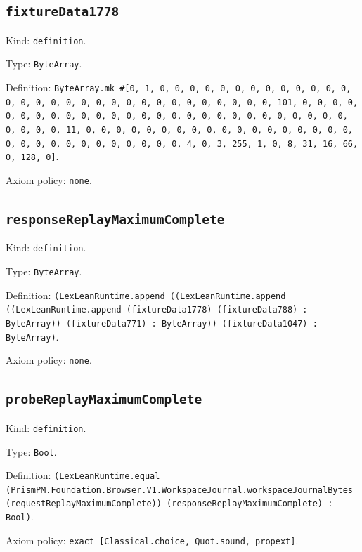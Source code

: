 \documentclass[11pt]{article}
\begin{document}
\subsection*{\texttt{fixtureData1778}}
\noindent Kind: \texttt{definition}.\par
\noindent Type: \texttt{ByteArray}.\par
\noindent Definition: \texttt{ByteArray.mk \#[0, 1, 0, 0, 0, 0, 0, 0, 0, 0, 0, 0, 0, 0, 0, 0, 0, 0, 0, 0, 0, 0, 0, 0, 0, 0, 0, 0, 0, 0, 0, 0, 0, 101, 0, 0, 0, 0, 0, 0, 0, 0, 0, 0, 0, 0, 0, 0, 0, 0, 0, 0, 0, 0, 0, 0, 0, 0, 0, 0, 0, 0, 0, 0, 0, 11, 0, 0, 0, 0, 0, 0, 0, 0, 0, 0, 0, 0, 0, 0, 0, 0, 0, 0, 0, 0, 0, 0, 0, 0, 0, 0, 0, 0, 0, 0, 4, 0, 3, 255, 1, 0, 8, 31, 16, 66, 0, 128, 0]}.\par
\noindent Axiom policy: \texttt{none}.\par
\subsection*{\texttt{responseReplayMaximumComplete}}
\noindent Kind: \texttt{definition}.\par
\noindent Type: \texttt{ByteArray}.\par
\noindent Definition: \texttt{(LexLeanRuntime.append ((LexLeanRuntime.append ((LexLeanRuntime.append (fixtureData1778) (fixtureData788) : ByteArray)) (fixtureData771) : ByteArray)) (fixtureData1047) : ByteArray)}.\par
\noindent Axiom policy: \texttt{none}.\par
\subsection*{\texttt{probeReplayMaximumComplete}}
\noindent Kind: \texttt{definition}.\par
\noindent Type: \texttt{Bool}.\par
\noindent Definition: \texttt{(LexLeanRuntime.equal (PrismPM.Foundation.Browser.V1.WorkspaceJournal.workspaceJournalBytes (requestReplayMaximumComplete)) (responseReplayMaximumComplete) : Bool)}.\par
\noindent Axiom policy: \texttt{exact [Classical.choice, Quot.sound, propext]}.\par
\end{document}
